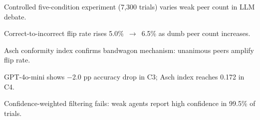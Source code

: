 \begin{highlights}
\item Controlled five-condition experiment (7,300 trials) varies weak peer count in LLM debate.
\item Correct-to-incorrect flip rate rises 5.0\%~$\to$~6.5\% as dumb peer count increases.
\item Asch conformity index confirms bandwagon mechanism: unanimous peers amplify flip rate.
\item GPT-4o-mini shows $-$2.0 pp accuracy drop in C3; Asch index reaches 0.172 in C4.
\item Confidence-weighted filtering fails: weak agents report high confidence in 99.5\% of trials.
\end{highlights}
